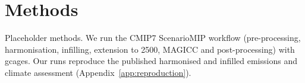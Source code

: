 \section{Methods}
\label{sec:methods}

Placeholder methods.
We run the CMIP7 ScenarioMIP workflow (pre-processing, harmonisation, infilling,
extension to 2500, MAGICC and post-processing) with gcages.
Our runs reproduce the published harmonised and infilled emissions and climate assessment
(Appendix~\ref{app:reproduction}).

